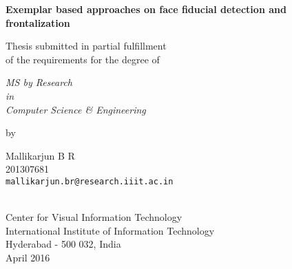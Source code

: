 \thispagestyle{empty}
\begin{center}
\vspace*{1.5cm}
{\Large \bf Exemplar based approaches on face fiducial detection and frontalization}

\vspace*{3.75cm}
{\large Thesis submitted in partial fulfillment\\}
{\large  of the requirements for the degree of \\}

\vspace*{1cm}
{\it {\large MS by Research} \\
{\large in\\}
{\large Computer Science \& Engineering \\}}

\vspace*{1cm}
{\large by}

\vspace*{5mm}
{\large Mallikarjun B R\\}
{\large 201307681\\
{\small \tt mallikarjun.br@research.iiit.ac.in}}


\vspace*{4.0cm}
{\\}
{\large Center for Visual Information Technology \\}
{\large International Institute of Information Technology\\}
{\large Hyderabad - 500 032, India\\}
{\large April 2016\\}
\end{center}

